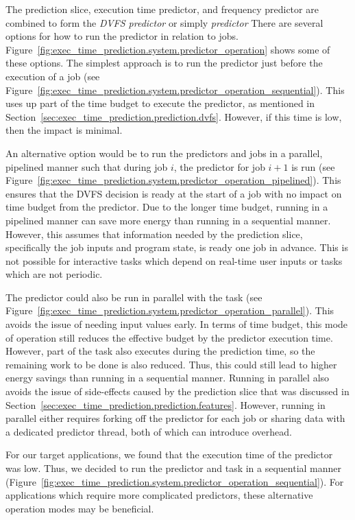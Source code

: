 The prediction slice, execution time predictor, and frequency predictor are
combined to form the \emph{DVFS predictor} or simply \emph{predictor} There are
several options for how to run the predictor in relation to jobs.
Figure~\ref{fig:exec_time_prediction.system.predictor_operation} shows some of
these options.  The simplest approach is to run the predictor just before the
execution of a job (see
Figure~\ref{fig:exec_time_prediction.system.predictor_operation_sequential}).
This uses up part of the time budget to execute the predictor, as
mentioned in Section~\ref{sec:exec_time_prediction.prediction.dvfs}. However,
if this time is low, then the impact is minimal.

An alternative option would be to run the predictors and jobs in a parallel,
pipelined manner such that during job $i$, the predictor for job $i+1$ is run
(see
Figure~\ref{fig:exec_time_prediction.system.predictor_operation_pipelined}).
This ensures that the DVFS decision is ready at the start of a job with no
impact on time budget from the predictor. Due to the longer time budget,
running in a pipelined manner can save more energy than running in a sequential
manner. However, this assumes that
information needed by the prediction slice, specifically the job inputs and
program state, is ready one job in advance. This is not possible for
interactive tasks which depend on real-time user inputs or tasks which are not
periodic.

The predictor could also be run in parallel with the task (see
Figure~\ref{fig:exec_time_prediction.system.predictor_operation_parallel}).
This avoids the
issue of needing input values early. In terms of time budget, this mode of
operation still reduces the effective budget by the predictor execution time.
However, part of the task also executes during the prediction time, so the
remaining work to be done is also reduced. Thus, this could still lead to
higher energy savings than running in a sequential manner.
Running in parallel also avoids the issue of side-effects
caused by the prediction slice that was discussed in
Section~\ref{sec:exec_time_prediction.prediction.features}. However, running in
parallel either requires forking off the predictor for each job or sharing data
with a dedicated predictor thread, both of which can introduce overhead.

For our target applications, we found that the execution time of the predictor
was low. Thus, we decided to run the predictor and task in a sequential manner
(Figure~\ref{fig:exec_time_prediction.system.predictor_operation_sequential}).
For applications which require more complicated predictors, these alternative
operation modes may be beneficial.
